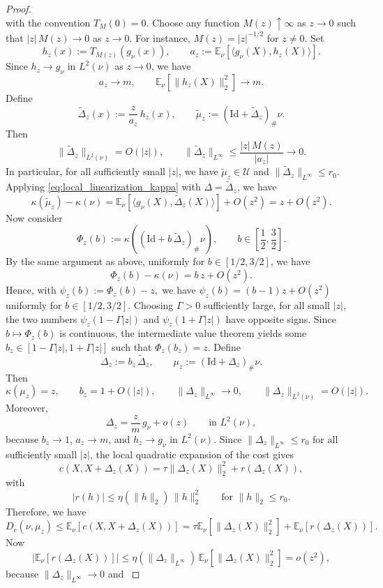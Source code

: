 \documentclass[11pt]{article}
\theoremstyle{definition}
\newcommand{\E}{\mathbb{E}}
\begin{document}
\begin{proof}
{\[\]
with the convention \(T_M(0)=0\). Choose any function \(M(z)\uparrow\infty\) as \(z\to0\)
such that $|z|\,M(z)\to0$ as \(z\to0\).
For instance, \(M(z)=|z|^{-1/2}\) for \(z\neq 0\).
Set
\[
h_z(x):=T_{M(z)}(g_\nu(x)),
\qquad
a_z:=\E_\nu\!\left[\langle g_\nu(X),h_z(X)\rangle\right].
\]
Since \(h_z\to g_\nu\) in \(L^2(\nu)\) as $z \to 0$, we have
\[
a_z\to m,
\qquad
\E_\nu[\|h_z(X)\|_2^2]\to m.
\]
Define
\[
\widetilde\Delta_z(x):=\frac{z}{a_z}\,h_z(x),
\qquad
\widetilde\mu_z:=(\text{Id}+\widetilde\Delta_z)_\#\nu.
\]
Then
\[
\|\widetilde\Delta_z\|_{L^2(\nu)}=O(|z|),
\qquad
\|\widetilde\Delta_z\|_{L^\infty}
\le
\frac{|z|\,M(z)}{|a_z|}
\to0.
\]
In particular, for all sufficiently small \(|z|\), we have $\widetilde\mu_z\in\mathcal U$ and $\|\widetilde\Delta_z\|_{L^\infty}\le r_0.$
Applying \eqref{eq:local_linearization_kappa} with \(\Delta=\widetilde\Delta_z\), we have 
\[
\kappa(\widetilde\mu_z)-\kappa(\nu)
=
\E_\nu\!\left[\langle g_\nu(X),\widetilde\Delta_z(X)\rangle\right]
+
O(z^2)
=
z+O(z^2).
\]
Now consider
\[
\Phi_z(b):=\kappa\!\left((\text{Id}+b\,\widetilde\Delta_z)_\#\nu\right),
\qquad b\in \left[\frac12,\frac32\right].
\]
By the same argument as above, uniformly for \(b\in [1/2,3/2]\), we have 
\[
\Phi_z(b)-\kappa(\nu)
=
b\,z+O(z^2).
\]
Hence, with $\psi_z(b):=\Phi_z(b)-z,$
we have $\psi_z(b)=(b-1)z+O(z^2)$
uniformly for \(b\in [1/2,3/2]\). Choosing \(\Gamma>0\) sufficiently large, for all
small \(|z|\), the two numbers $\psi_z(1-\Gamma |z|)$ and $\psi_z(1+\Gamma |z|)$
have opposite signs. Since \(b\mapsto \Phi_z(b)\) is continuous, the intermediate value theorem
yields some \(b_z\in [1-\Gamma|z|,1+\Gamma|z|]\) such that $\Phi_z(b_z)=z.$
Define
\[
\Delta_z:=b_z\,\widetilde\Delta_z,
\qquad
\mu_z:=(\text{Id}+\Delta_z)_\#\nu.
\]
Then
\[
\kappa(\mu_z)=z,
\qquad
b_z=1+O(|z|),
\qquad
\|\Delta_z\|_{L^\infty}\to0,
\qquad
\|\Delta_z\|_{L^2(\nu)}=O(|z|).
\]
Moreover,
\[
\Delta_z
=
\frac{z}{m}\,g_\nu + o(z)
\qquad\text{in }L^2(\nu),
\]
because \(b_z\to1\), \(a_z\to m\), and \(h_z\to g_\nu\) in \(L^2(\nu)\).
Since \(\|\Delta_z\|_{L^\infty}\le r_0\) for all sufficiently small \(|z|\), the local quadratic
expansion of the cost gives
\[
c(X,X+\Delta_z(X))
=
\tau \|\Delta_z(X)\|_2^2 + r(\Delta_z(X)),
\]
with
\[
|r(h)|\le \eta(\|h\|_2)\,\|h\|_2^2
\qquad\text{for }\|h\|_2\le r_0.
\]
Therefore, we have 
\[
D_c(\nu,\mu_z)
\le
\E_\nu\!\left[c(X,X+\Delta_z(X))\right]
=
\tau \E_\nu[\|\Delta_z(X)\|_2^2]
+
\E_\nu[r(\Delta_z(X))].
\]
Now
\[
\left|\E_\nu[r(\Delta_z(X))]\right|
\le
\eta(\|\Delta_z\|_{L^\infty})\,
\E_\nu[\|\Delta_z(X)\|_2^2]
=
o(z^2),
\]
because \(\|\Delta_z\|_{L^\infty}\to0\) and
}
\end{proof}
\end{document}
